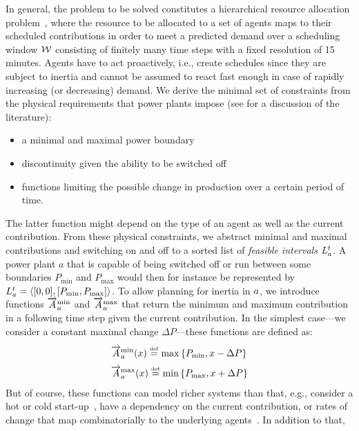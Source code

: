 \documentclass[conference]{IEEEtran}
\begin{document}
In general, the problem to be solved constitutes a hierarchical resource allocation problem~\cite{VanZandt1995},
where the resource to be allocated to a set of agents maps to their scheduled contributions in order
to meet a predicted demand over a scheduling window $\mathcal{W}$ consisting of finitely many time steps with a fixed resolution
of 15 minutes.
 Agents have to act proactively, i.e., create schedules since they
are subject to inertia and cannot be assumed to react fast enough in case of rapidly increasing (or decreasing) demand.
We derive the minimal set of constraints from the physical requirements that 
power plants impose (see \cite{SchiendorferSyn2014} for a discussion of the literature):
\begin{itemize}
\item a minimal and maximal power boundary
\item discontinuity given the ability to be switched off
\item functions limiting the possible change in production over a certain period of time.
\end{itemize}
The latter function
might depend on the type of an agent as well as the current contribution. 
From these physical constraints, we abstract minimal and maximal contributions
and switching on and off to a sorted list of \emph{feasible intervals} $L^{t}_{a}$.
A power plant $a$ that is capable of being switched off or run between some boundaries
$P_{\mathrm{min}}$ and $P_{\mathrm{max}}$ would then for instance be represented by 
$L^{t}_{a} = \langle [0,0], [P_{\mathrm{min}}, P_{\mathrm{max}}] \rangle$.
To allow planning for inertia in $a$, we introduce functions $\overrightarrow{A}^{\mathrm{min}}_{a}$ and
$\overrightarrow{A}^{\mathrm{max}}_{a}$ that return the minimum and maximum contribution in a following time step
given the current contribution. In the simplest case---we consider a constant maximal change $\Delta P$---these 
functions are defined as:
%
		\begin{align*}
		\label{eq:changeInContribution}
		&\ChangeSpeedMin\AnAgent(x) \overset{\underset{\mathrm{def}}{}}{=} \operatorname{max}\left\{P_{\mathrm{min}}, x - \Delta P\right\}\\
		&\ChangeSpeedMax\AnAgent(x) \overset{\underset{\mathrm{def}}{}}{=} \operatorname{min}\left\{P_{\mathrm{max}}, x + \Delta P\right\}
		\end{align*}
%
But of course, these functions can model richer systems than that, e.g., consider a hot or cold start-up~\cite{SchiendorferSyn2014},
have a dependency on the current contribution, or rates of change that map combinatorially to the underlying agents~\cite{Schiendorfer2014}. In addition to that,
\end{document}
